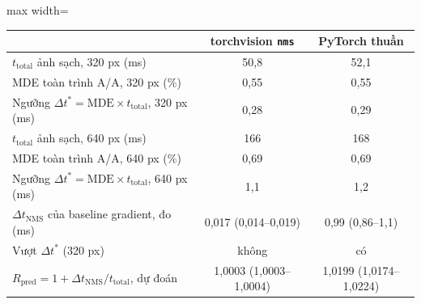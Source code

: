 \documentclass[a4paper,fleqn]{cas-dc}
\begin{document}
\par\begin{center}
\centering\small
{}
\label{tab:threshold}
\begin{adjustbox}{max width=\columnwidth}
\begin{tabular}{@{}lcc@{}}
\toprule
 & torchvision \texttt{nms} & PyTorch thuần \\
\midrule
$t_{\mathrm{total}}$ ảnh sạch, 320 px (ms) & 50,8 & 52,1 \\
MDE toàn trình A/A, 320 px (\%) & 0,55 & 0,55 \\
Ngưỡng $\Delta t^{*}=\mathrm{MDE}\times t_{\mathrm{total}}$, 320 px (ms) & 0,28 & 0,29 \\
$t_{\mathrm{total}}$ ảnh sạch, 640 px (ms) & 166 & 168 \\
MDE toàn trình A/A, 640 px (\%) & 0,69 & 0,69 \\
Ngưỡng $\Delta t^{*}=\mathrm{MDE}\times t_{\mathrm{total}}$, 640 px (ms) & 1,1 & 1,2 \\
\midrule
$\Delta t_{\mathrm{NMS}}$ của baseline gradient, đo (ms) & 0,017 (0,014--0,019) & 0,99 (0,86--1,1) \\
Vượt $\Delta t^{*}$ (320 px) & không & có \\
$R_{\mathrm{pred}} = 1+\Delta t_{\mathrm{NMS}}/t_{\mathrm{total}}$, dự đoán & 1,0003 (1,0003--1,0004) & 1,0199 (1,0174--1,0224) \\
\bottomrule
\end{tabular}
\end{adjustbox}
\end{center}\par
\end{document}
